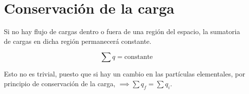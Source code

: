 \section{Conservación de la carga}

Si no hay flujo de cargas dentro o fuera de una región del espacio,
la sumatoria de cargas en dicha región permanecerá constante.

\vspace{.3cm}
\begin{equation}
    \sum q = \text{constante}
\end{equation}
\vspace{.3cm}

Esto no es trivial,
puesto que si hay un cambio en las partículas elementales,
por principio de conservación de la carga,
\(\implies \sum q_f = \sum q_i\).
